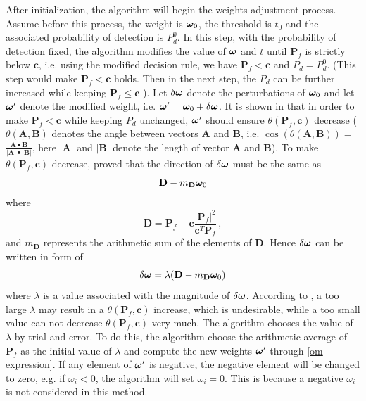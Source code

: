 After initialization, the algorithm will begin the weights adjustment process. 
Assume before this process, the weight is $\boldsymbol{\omega}_0$, the threshold is $t_0$ and the associated probability of detection is $P_d^0$.
In this step, with the probability of detection fixed, the algorithm modifies the value of $\boldsymbol{\omega}$ and $t$ until $\mathbf{P}_f$ is strictly below $ \mathbf{c}$, i.e. using the modified decision rule, we have $\mathbf{P}_f < \mathbf{c}$ and $P_d = P_d^0$. (This step would make $\mathbf{P}_f < \mathbf{c}$ holds. Then in the next step, the $P_d$ can be further increased while keeping $\mathbf{P}_f \leq \mathbf{c}$ \cite{zhang2000efficient}). 
Let $\delta\boldsymbol{\omega}$ denote the perturbations of $\boldsymbol{\omega}_0$ and let $\boldsymbol{\omega}'$ denote the modified weight, i.e. $\boldsymbol{\omega}' = \boldsymbol{\omega}_0 + \delta\boldsymbol{\omega}$.  It is shown in \cite{zhang2000efficient} that in order to make $\mathbf{P}_f < \mathbf{c}$ while keeping $P_d$ unchanged, $\boldsymbol{\omega}'$ should ensure $\theta(\mathbf{P}_f, \mathbf{c})$ decrease ($\theta(\mathbf{A}, \mathbf{B})$ denotes the angle between vectors $\mathbf{A}$ and $\mathbf{B}$, i.e. 
$\cos (\theta(\mathbf{A}, \mathbf{B})) =$ 
$\frac{\mathbf{A}\bullet \mathbf{B}}{|\mathbf{A}|\bullet|\mathbf{B}|}$,
here $|\mathbf{A}|$ and $|\mathbf{B}|$ denote the length of vector $\mathbf{A}$ and $\mathbf{B}$). To make $\theta(\mathbf{P}_f, \mathbf{c})$ decrease, \cite{zhang2000efficient} proved that the direction of $\delta\boldsymbol{\omega}$ must be the same as
\begin{equation}
\label{direction}
\mathbf{D} - m_\mathbf{D}\boldsymbol{\omega}_0
\end{equation}
where 
\[
\mathbf{D} = \mathbf{P}_f - \mathbf{c}\frac{|\mathbf{P}_f|^2}{\mathbf{c}^T\mathbf{P}_f}\,,
\]
and $m_{\mathbf{D}}$ represents the arithmetic sum of the elements of $\mathbf{D}$. Hence $\delta\boldsymbol{\omega}$ can be written in form of 
\begin{equation}
\label{om expression}
\delta\boldsymbol{\omega} = \lambda( \mathbf{D} - m_\mathbf{D}\boldsymbol{\omega}_0) 
\end{equation}
where $\lambda$ is a value associated with the magnitude of $\delta\boldsymbol{\omega}$.
According to \cite{zhang2000efficient}, a too large $\lambda$ may result in a  $\theta(\mathbf{P}_f, \mathbf{c})$ increase, which is undesirable, while a too small value can not decrease $\theta(\mathbf{P}_f, \mathbf{c})$ very much. The algorithm chooses the value of $\lambda$ by trial and error. To do this, the algorithm choose the arithmetic average of $\mathbf{P}_f$ as the initial value of $\lambda$ and compute the new weights $\boldsymbol{\omega}'$ through \eqref{om expression}. 
If any element of $\boldsymbol{\omega}'$ is negative, the negative element will be changed to zero, e.g. if $\omega_i < 0$, the algorithm will set $\omega_i = 0$. This is because a negative  $\omega_i$ is not considered in this method.  

